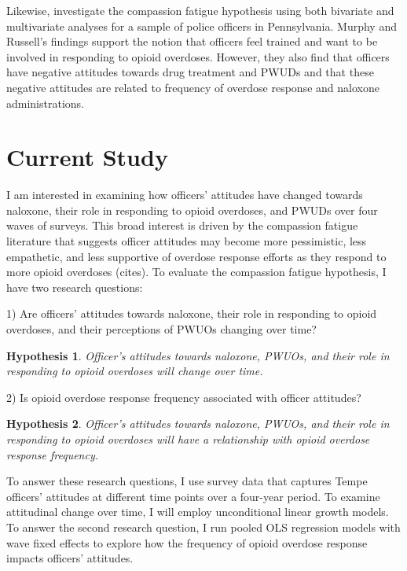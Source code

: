 Likewise, \textcite{murphy_police_2020} investigate the compassion fatigue hypothesis using both bivariate and multivariate analyses for a sample of police officers in Pennsylvania. Murphy and Russell’s findings support the notion that officers feel trained and want to be involved in responding to opioid overdoses. However, they also find that officers have negative attitudes towards drug treatment and PWUDs and that these negative attitudes are related to frequency of overdose response and naloxone administrations. 

\section{Current Study}

I am interested in examining how officers’ attitudes have changed towards naloxone, their role in responding to opioid overdoses, and PWUDs over four waves of surveys. This broad interest is driven by the compassion fatigue literature that suggests officer attitudes may become more pessimistic, less empathetic, and less supportive of overdose response efforts as they respond to more opioid overdoses (cites). To evaluate the compassion fatigue hypothesis, I have two research questions:

1) Are officers’ attitudes towards naloxone, their role in responding to opioid overdoses, and their perceptions of PWUOs changing over time? 

\newtheorem{hypothesis}{Hypothesis}

\begin{hypothesis} Officer's attitudes towards naloxone, PWUOs, and their role in responding to opioid overdoses will change over time.\end{hypothesis}

2) Is opioid overdose response frequency associated with officer attitudes? 

\begin{hypothesis} Officer's attitudes towards naloxone, PWUOs, and their role in responding to opioid overdoses will have a relationship with opioid overdose response frequency. \end{hypothesis}

To answer these research questions, I use survey data that captures Tempe officers’ attitudes at different time points over a four-year period. To examine attitudinal change over time, I will employ unconditional linear growth models. To answer the second research question, I run pooled OLS regression models with wave fixed effects to explore how the frequency of opioid overdose response impacts officers’ attitudes.

